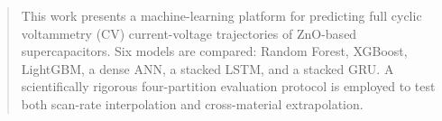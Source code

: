 \begin{abstract}
This work presents a machine-learning platform for predicting full cyclic voltammetry
(CV) current-voltage trajectories of ZnO-based supercapacitors. Six models are compared:
Random Forest, XGBoost, LightGBM, a dense ANN, a stacked LSTM, and a stacked GRU.
A scientifically rigorous four-partition evaluation protocol is employed to test both
scan-rate interpolation and cross-material extrapolation.
\end{abstract}
